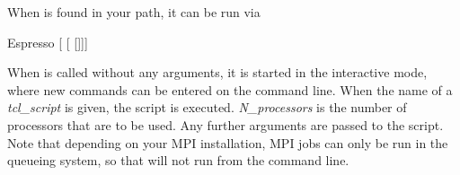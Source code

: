 When \es is found in your path, it can be run via
\begin{code}
Espresso [ [ []]]
\end{code}

 When \es{} is called without any arguments,
it is started in the interactive mode, where new commands can be
entered on the command line. When the name of a \textit{tcl\_script}
is given, the script is executed. \textit{N\_processors} is the number
of processors that are to be used. Any further arguments are passed to
the script. Note that depending on your MPI installation, MPI jobs can
only be run in the queueing system, so that \es will not run from
the command line.



